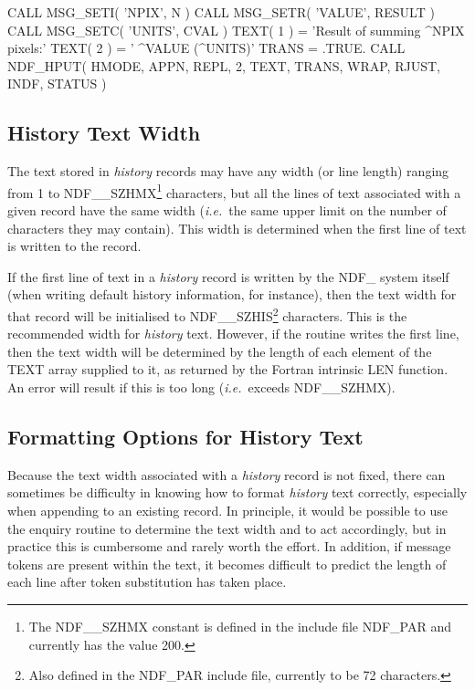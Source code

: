 \documentclass[twoside,11pt,nolof]{starlink}
\providecommand{\st}[1]{{\emph{#1}}}
\begin{document}
\small
\begin{terminalv}
      CALL MSG_SETI( 'NPIX', N )
      CALL MSG_SETR( 'VALUE', RESULT )
      CALL MSG_SETC( 'UNITS', CVAL )
      TEXT( 1 ) = 'Result of summing ^NPIX pixels:'
      TEXT( 2 ) = '                       ^VALUE (^UNITS)'
      TRANS = .TRUE.
      CALL NDF_HPUT( HMODE, APPN, REPL, 2, TEXT, TRANS, WRAP, RJUST, INDF,
                     STATUS )
\end{terminalv}
\normalsize

\subsection{History Text Width}

The text stored in \st{history\/} records may have any width (or line length)
ranging from 1 to NDF\_\_SZHMX\footnote{The NDF\_\_SZHMX constant is
defined in the include file NDF\_PAR and currently has the value 200.}
characters, but all the lines of text associated with a given record
have the same width (\st{i.e.}\ the same upper limit on the number of
characters they may contain). This width is determined when the first
line of text is written to the record.

If the first line of text in a \st{history\/} record is written by the NDF\_
system itself (when writing default history information, for
instance), then the text width for that record will be initialised to
NDF\_\_SZHIS\footnote{Also defined in the NDF\_PAR include file,
currently to be 72 characters.} characters. This is the recommended
width for \st{history\/} text. However, if the  routine writes the
first line, then the text width will be determined by the length of
each element of the TEXT array supplied to it, as returned by the
Fortran intrinsic LEN function. An error will result if this is too
long (\st{i.e.}\ exceeds NDF\_\_SZHMX).

\subsection{Formatting Options for History Text}

Because the text width associated with a \st{history\/} record is not fixed,
there can sometimes be difficulty in knowing how to format \st{history\/}
text correctly, especially when appending to an existing record.  In
principle, it would be possible to use the enquiry routine 
to determine the text width and to act accordingly, but in practice
this is cumbersome and rarely worth the effort. In addition, if
message tokens are present within the text, it becomes difficult to
predict the length of each line after token substitution has taken
place.
\end{document}
